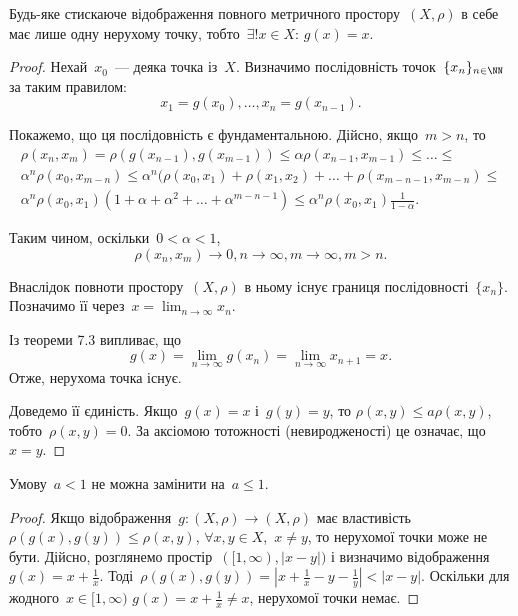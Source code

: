 \begin{theorem}
Будь-яке стискаюче відображення повного
метричного простору~$(X, \rho)$ в себе має лише одну
нерухому точку, тобто~$\exists! x \in X$: $g(x) = x$.
\end{theorem}

\begin{proof}
Нехай~$x_0$~--- деяка точка із~$X$. Визначимо
послідовність точок~$\{x_n\}_{n \in \NN}$ за таким правилом:
\begin{equation*}
    x_1 = g(x_0), \dots, x_n = g(x_{n - 1}).
\end{equation*}

Покажемо, що ця послідовність є фундаментальною.
Дійсно, якщо~$m > n$, то
\begin{multline*}
    \rho(x_n, x_m) = \rho(g(x_{n - 1}), g(x_{m - 1})) \le
    \alpha \rho(x_{n - 1}, x_{m - 1}) \le \dots \le \\
    \alpha^n \rho(x_0, x_{m - n}) \le
    \alpha^n ( \rho(x_0, x_1) + \rho(x_1, x_2) + \dots + \rho(x_{m - n - 1}, x_{m - n}) \le \\
    \alpha^n \rho(x_0, x_1) (1 + \alpha + \alpha^2 + \dots + \alpha^{m - n - 1}) \le
    \alpha^n \rho(x_0, x_1) \tfrac{1}{1 - \alpha}.
\end{multline*}

Таким чином, оскільки~$0 < \alpha < 1$,
\begin{equation*}
    \rho(x_n, x_m) \to 0, n \to \infty, m \to \infty, m > n.
\end{equation*}

Внаслідок повноти простору~$(X, \rho)$ в ньому існує границя
послідовності~$\{x_n\}$. Позначимо її через~$x = \lim_{n \to \infty} x_n$.

Із теореми 7.3 випливає, що
\begin{equation*}
    g(x) = \lim_{n \to \infty} g(x_n) = \lim_{n \to \infty} x_{n + 1} = x.
\end{equation*}
Отже, нерухома точка існує.

Доведемо її єдиність. Якщо~$g(x) = x$ і~$g(y) = y$, то
$\rho(x, y) \le a \rho(x, y)$, тобто~$\rho(x, y) = 0$.
За аксіомою тотожності (невиродженості) це означає, що~$x = y$. 
\end{proof}

\begin{corollary}
Умову~$a < 1$ не можна замінити на~$a \le 1$.
\end{corollary}

\begin{proof}
Якщо відображення~$g: (X, \rho) \to (X, \rho)$
має властивість~$\rho(g(x), g(y)) \le \rho(x, y)$,
$\forall x, y \in X$,~$x \ne y$,
то нерухомої точки може не бути.
Дійсно, розглянемо простір~$([1, \infty), |x - y|)$
і визначимо відображення~$g(x) = x + \frac{1}{x}$.
Тоді~$\rho(g(x), g(y)) = |x + \frac{1}{x} - y - \frac{1}{y}| < |x - y|$. 
Оскільки для жодного~$x \in [1, \infty)$
$g(x) = x + \frac{1}{x} \ne x$,
нерухомої точки немає.
\end{proof}

